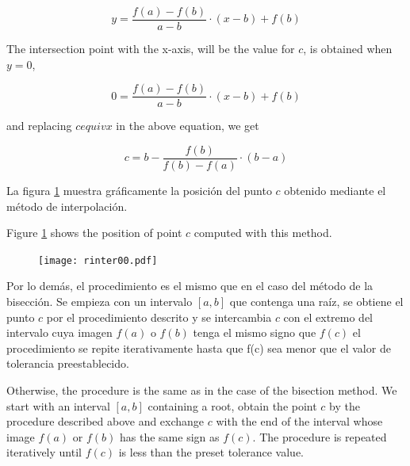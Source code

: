 \begin{paracol}{2}
\begin{equation*}
y=\frac{f(a)-f(b)}{a-b}\cdot(x-b)+f(b)
\end{equation*}

The intersection point with the x-axis, will be the value for $c$, is obtained when $y=0$,

\begin{equation*}
0=\frac{f(a)-f(b)}{a-b}\cdot(x-b)+f(b)
\end{equation*}

and replacing $cequiv x$ in the above equation, we get

\begin{equation*}
c=b-\frac{f(b)}{f(b)-f(a)}\cdot(b-a)
\end{equation*}

\switchcolumn
La figura \ref{fig:regulaf} muestra  gráficamente la posición del punto $c$ obtenido mediante el método de interpolación.

\switchcolumn
Figure \ref{fig:regulaf} shows the position of point $c$ computed with this method.
\end{paracol}

\begin{figure}[h]
\centering
\texttt{[image: rinter00.pdf]}

\label{fig:regulaf}
\end{figure}

\begin{paracol}{2}
    Por lo demás, el procedimiento es el mismo que en el caso del método de la bisección. Se empieza con un intervalo $[a,b]$ que  contenga una raíz, se obtiene el punto $c$ por el procedimiento descrito y se intercambia $c$ con el extremo del intervalo cuya imagen $f(a)$ o $f(b)$ tenga el mismo signo que $f(c)$ el procedimiento se repite iterativamente hasta que f(c) sea menor que el valor de tolerancia preestablecido. 

    \switchcolumn
    Otherwise, the procedure is the same as in the case of the bisection method. We start with an interval $[a,b]$ containing a root, obtain the point $c$ by the procedure described above and exchange $c$ with the end of the interval whose image $f(a)$ or $f(b)$ has the same sign as $f(c)$. The procedure is repeated iteratively until $f(c)$ is less than the preset tolerance value. 
    
\end{paracol}


